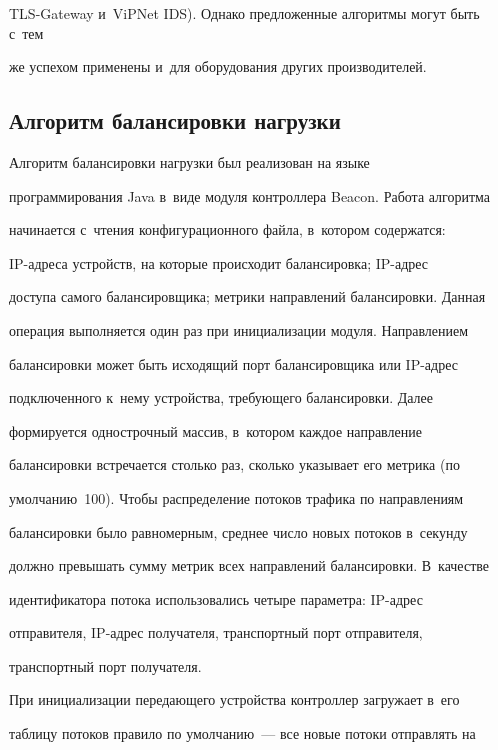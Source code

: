 TLS-Gateway и~ViPNet IDS). Однако предложенные алгоритмы могут быть с~тем 


же успехом применены и~для оборудования других производителей.





\subsection{Алгоритм балансировки нагрузки}


  


  Алгоритм балансировки нагрузки был реализован на языке 


программирования Java в~виде модуля контроллера Beacon. Работа алгоритма 


начинается с~чтения конфигурационного файла, в~котором содержатся:  


IP-ад\-ре\-са устройств, на которые происходит балансировка; IP-ад\-рес 


доступа самого балансировщика; метрики направлений балансировки. Данная 


операция выполняется один раз при инициализации модуля. Направлением 


балансировки может быть исходящий порт балансировщика или IP-ад\-рес 


подключенного к~нему устройства, требующего балансировки. Далее 


формируется однострочный массив, в~котором каждое направление 


балансировки встречается столько раз, сколько указывает его метрика (по 


умолчанию~100). Чтобы распределение потоков трафика по направлениям 


балансировки было равномерным, среднее число новых потоков в~секунду 


должно превышать сумму метрик всех направлений балансировки. В~качестве 


идентификатора потока использовались четыре параметра: IP-ад\-рес 


отправителя, IP-ад\-рес получателя, транспортный порт отправителя, 


транспортный порт получателя.


  


  При инициализации передающего устройства контроллер загружает в~его 


таблицу потоков правило по умолчанию~--- все новые потоки отправлять на 


